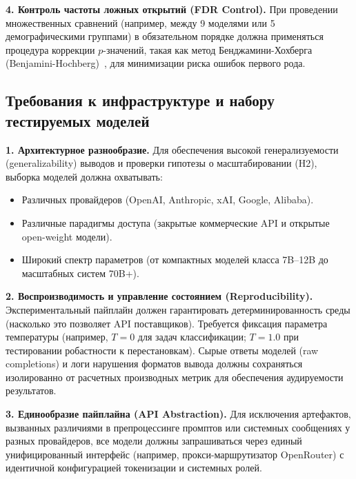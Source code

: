 \textbf{4. Контроль частоты ложных открытий (FDR Control).} 
При проведении множественных сравнений (например, между 9 моделями или 5 демографическими группами) в обязательном порядке должна применяться процедура коррекции $p$-значений, такая как метод Бенджамини-Хохберга (Benjamini-Hochberg)~\cite{benjamini1995controlling}, для минимизации риска ошибок первого рода.

\subsection{Требования к инфраструктуре и набору тестируемых моделей}

\textbf{1. Архитектурное разнообразие.} 
Для обеспечения высокой генерализуемости (generalizability) выводов и проверки гипотезы о масштабировании (H2), выборка моделей должна охватывать:
\begin{itemize}
    \item Различных провайдеров (OpenAI, Anthropic, xAI, Google, Alibaba).
    \item Различные парадигмы доступа (закрытые коммерческие API и открытые open-weight модели).
    \item Широкий спектр параметров (от компактных моделей класса 7B--12B до масштабных систем 70B+).
\end{itemize}

\textbf{2. Воспроизводимость и управление состоянием (Reproducibility).} 
Экспериментальный пайплайн должен гарантировать детерминированность среды (насколько это позволяет API поставщиков). Требуется фиксация параметра температуры (например, $T=0$ для задач классификации; $T=1.0$ при тестировании робастности к перестановкам). Сырые ответы моделей (raw completions) и логи нарушения форматов вывода должны сохраняться изолированно от расчетных производных метрик для обеспечения аудируемости результатов.

\textbf{3. Единообразие пайплайна (API Abstraction).} 
Для исключения артефактов, вызванных различиями в препроцессинге промптов или системных сообщениях у разных провайдеров, все модели должны запрашиваться через единый унифицированный интерфейс (например, прокси-маршрутизатор OpenRouter) с идентичной конфигурацией токенизации и системных ролей.